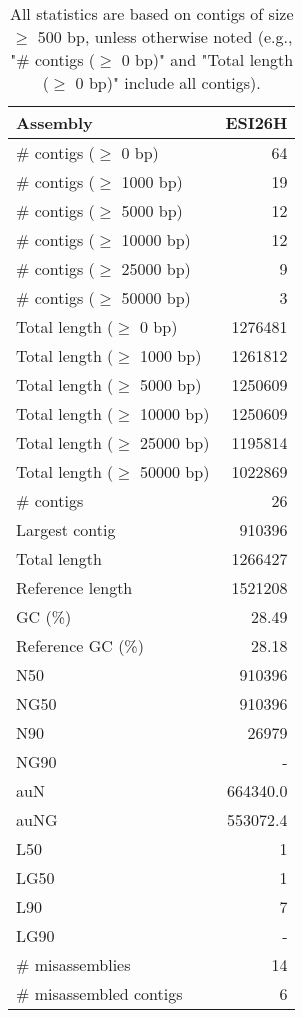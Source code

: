 \documentclass[12pt,a4paper]{article}
\begin{document}
\begin{table}[ht]
\begin{center}
\caption{All statistics are based on contigs of size $\geq$ 500 bp, unless otherwise noted (e.g., "\# contigs ($\geq$ 0 bp)" and "Total length ($\geq$ 0 bp)" include all contigs).}
\begin{tabular}{|l*{1}{|r}|}
\hline
Assembly & ESI26H \\ \hline
\# contigs ($\geq$ 0 bp) & 64 \\ \hline
\# contigs ($\geq$ 1000 bp) & 19 \\ \hline
\# contigs ($\geq$ 5000 bp) & 12 \\ \hline
\# contigs ($\geq$ 10000 bp) & 12 \\ \hline
\# contigs ($\geq$ 25000 bp) & 9 \\ \hline
\# contigs ($\geq$ 50000 bp) & 3 \\ \hline
Total length ($\geq$ 0 bp) & 1276481 \\ \hline
Total length ($\geq$ 1000 bp) & 1261812 \\ \hline
Total length ($\geq$ 5000 bp) & 1250609 \\ \hline
Total length ($\geq$ 10000 bp) & 1250609 \\ \hline
Total length ($\geq$ 25000 bp) & 1195814 \\ \hline
Total length ($\geq$ 50000 bp) & 1022869 \\ \hline
\# contigs & 26 \\ \hline
Largest contig & 910396 \\ \hline
Total length & 1266427 \\ \hline
Reference length & 1521208 \\ \hline
GC (\%) & 28.49 \\ \hline
Reference GC (\%) & 28.18 \\ \hline
N50 & 910396 \\ \hline
NG50 & 910396 \\ \hline
N90 & 26979 \\ \hline
NG90 & - \\ \hline
auN & 664340.0 \\ \hline
auNG & 553072.4 \\ \hline
L50 & 1 \\ \hline
LG50 & 1 \\ \hline
L90 & 7 \\ \hline
LG90 & - \\ \hline
\# misassemblies & 14 \\ \hline
\# misassembled contigs & 6 \\ \hline

\end{tabular}
\end{center}
\end{table}
\end{document}
